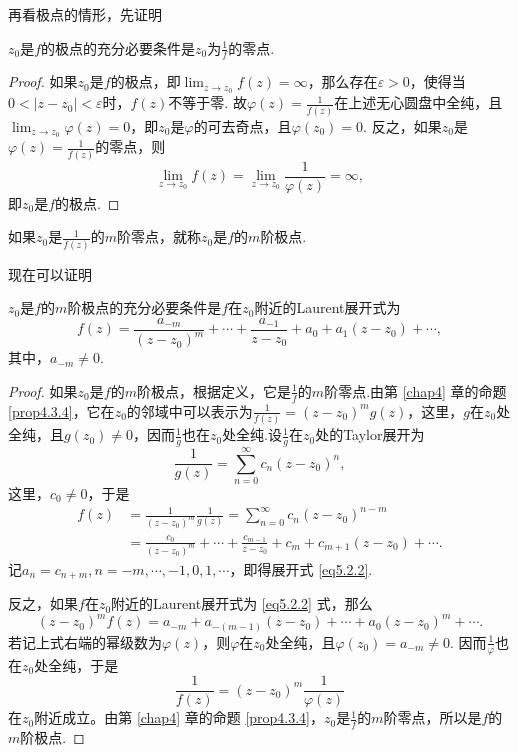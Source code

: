 再看极点的情形，先证明
\begin{prop}\label{prop5.2.2}
  $z_0$是$f$的极点的充分必要条件是$z_0$为$\frac1f$的零点.
\end{prop}
\begin{proof}
  如果$z_0$是$f$的极点，即$\lim_{z\to z_0}f(z)=\infty$，那么存在$\varepsilon>0$，使得当$0<|z-z_0|<\varepsilon$时，$f(z)$不等于零. 故$\varphi(z)=\frac1{f(z)}$在上述无心圆盘中全纯，且$\lim_{z\to z_0}\varphi(z)=0$，即$z_0$是$\varphi$的可去奇点，且$\varphi(z_0)=0$. 反之，如果$z_0$是$\varphi(z)=\frac1{f(z)}$的零点，则
  \[
    \lim_{z\to z_0}f(z) = \lim_{z\to z_0}\frac1{\varphi(z)} = \infty,
  \]
  即$z_0$是$f$的极点.
\end{proof}

\begin{definition}\label{def5.2.3}
  如果$z_0$是$\frac1{f(z)}$的$m$阶零点，就称$z_0$是$f$的$m$阶极点.
\end{definition}

现在可以证明
\begin{theorem}\label{thm5.2.4}
  $z_0$是$f$的$m$阶极点的充分必要条件是$f$在$z_0$附近的Laurent展开式为
  \begin{equation}\label{eq5.2.2}
    f(z) = \frac{a_{-m}}{(z-z_0)^m} + \cdots+\frac{a_{-1}}{z-z_0} + a_0 + a_1(z-z_0) + \cdots,
  \end{equation}
  其中，$a_{-m}\ne0$.
\end{theorem}
\begin{proof}
  如果$z_0$是$f$的$m$阶极点，根据定义，它是$\frac1f$的$m$阶零点.由第 \ref{chap4} 章的命题 \ref{prop4.3.4}，它在$z_0$的邻域中可以表示为$\frac1{f(z)}=(z-z_0)^mg(z)$，这里，$g$在$z_0$处全纯，且$g(z_0)\ne0$，因而$\frac1g$也在$z_0$处全纯.设$\frac1g$在$z_0$处的Taylor展开为
  \[
    \frac1{g(z)} = \sum_{n=0}^\infty c_n(z-z_0)^n,
  \]
  这里，$c_0\ne0$，于是
  \begin{align*}
    f(z) & = \frac1{(z-z_0)^m}\frac1{g(z)} = \sum_{n=0}^\infty c_n(z-z_0)^{n-m}\\
    & = \frac{c_0}{(z-z_0)^m} + \cdots + \frac{c_{m-1}}{z-z_0}
      + c_m + c_{m+1}(z-z_0) + \cdots.
  \end{align*}
  记$a_n=c_{n+m},n=-m,\cdots,-1,0,1,\cdots$，即得展开式 \eqref{eq5.2.2}.

  反之，如果$f$在$z_0$附近的Laurent展开式为 \eqref{eq5.2.2} 式，那么
  \[
    (z-z_0)^mf(z) = a_{-m}+a_{-(m-1)}(z-z_0) + \cdots + a_0(z-z_0)^m + \cdots.
  \]
  若记上式右端的幂级数为$\varphi(z)$，则$\varphi$在$z_0$处全纯，且$\varphi(z_0)=a_{-m}\ne0$. 因而$\frac1{\varphi}$也在$z_0$处全纯，于是
  \[
    \frac1{f(z)} = (z-z_0)^m\frac1{\varphi(z)}
  \]
  在$z_0$附近成立。由第 \ref{chap4} 章的命题 \ref{prop4.3.4}，$z_0$是$\frac1f$的$m$阶零点，所以是$f$的$m$阶极点.
\end{proof}

